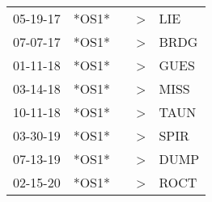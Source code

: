 \begin{supertabular}{p{0.07\textwidth}p{0.06\textwidth}p{0.02\textwidth}p{0.02\textwidth}p{0.06\textwidth}}
 05-19-17\textsuperscript{} &                   *OS1* &    &  \textgreater &   LIE\textsuperscript{} \\
 07-07-17\textsuperscript{} &                   *OS1* &    &  \textgreater &  BRDG\textsuperscript{} \\
 01-11-18\textsuperscript{} &                   *OS1* &    &  \textgreater &  GUES\textsuperscript{} \\
 03-14-18\textsuperscript{} &                   *OS1* &    &  \textgreater &  MISS\textsuperscript{} \\
 10-11-18\textsuperscript{} &                   *OS1* &    &  \textgreater &  TAUN\textsuperscript{} \\
 03-30-19\textsuperscript{} &                   *OS1* &    &  \textgreater &  SPIR\textsuperscript{} \\
 07-13-19\textsuperscript{} &                   *OS1* &    &  \textgreater &  DUMP\textsuperscript{} \\
 02-15-20\textsuperscript{} &                   *OS1* &    &  \textgreater &  ROCT\textsuperscript{} \\
\end{supertabular}
